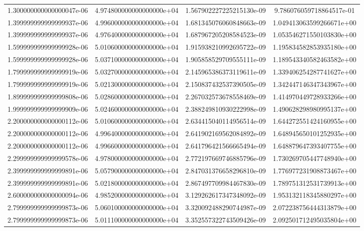 \begin{table}
\begin{tabular}{S[scientific-notation=fixed,fixed-exponent = -6 ]@{\qquad} S[scientific-notation=fixed,fixed-exponent = 0, round-precision=0 ] S S[scientific-notation=fixed,fixed-exponent =0 ]}
  1.300000000000000047e-06 & 4.974800000000000000e+04 & 1.567902227225215130e-09 & 9.786076059718864517e-01\\
  1.399999999999999937e-06 & 4.996000000000000000e+04 & 1.681345076060848663e-09 & 1.049413063599266671e+00\\
  1.399999999999999937e-06 & 4.976400000000000000e+04 & 1.687967205208584523e-09 & 1.053546271550103830e+00\\
  1.599999999999999928e-06 & 5.010600000000000000e+04 & 1.915938210992695722e-09 & 1.195834582853935180e+00\\
  1.599999999999999928e-06 & 5.037100000000000000e+04 & 1.905858529709555111e-09 & 1.189543340582463582e+00\\
  1.799999999999999919e-06 & 5.032700000000000000e+04 & 2.145965386373119611e-09 & 1.339406254287741627e+00\\
  1.799999999999999919e-06 & 5.021300000000000000e+04 & 2.150837432537390505e-09 & 1.342447146347343967e+00\\
  1.899999999999999808e-06 & 5.028600000000000000e+04 & 2.267032573678558469e-09 & 1.414970449728933266e+00\\
  1.999999999999999909e-06 & 5.024600000000000000e+04 & 2.388249810930222998e-09 & 1.490628298980995137e+00\\
  2.200000000000000112e-06 & 5.010600000000000000e+04 & 2.634415040114956514e-09 & 1.644272551424160955e+00\\
  2.200000000000000112e-06 & 4.996400000000000000e+04 & 2.641902169562084892e-09 & 1.648945650101252935e+00\\
  2.200000000000000112e-06 & 4.996600000000000000e+04 & 2.641796421566665494e-09 & 1.648879647393407755e+00\\
  2.299999999999999578e-06 & 4.978000000000000000e+04 & 2.772197669746885796e-09 & 1.730269705447748940e+00\\
  2.399999999999999891e-06 & 5.057900000000000000e+04 & 2.847031376658296810e-09 & 1.776977231908873467e+00\\
  2.399999999999999891e-06 & 5.021800000000000000e+04 & 2.867497709984467830e-09 & 1.789751312531739913e+00\\
  2.600000000000000094e-06 & 4.985200000000000000e+04 & 3.129262617347348092e-09 & 1.953132118345880297e+00\\
  2.799999999999999873e-06 & 5.060100000000000000e+04 & 3.320092488290744987e-09 & 2.072238756444313879e+00\\
  2.799999999999999873e-06 & 5.011100000000000000e+04 & 3.352557322743509426e-09 & 2.092501712495035804e+00\\

\end{tabular}
\end{table}
